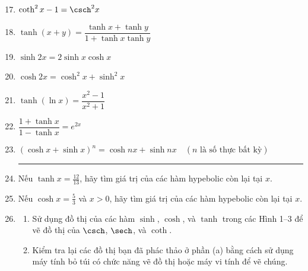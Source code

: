 \noindent
\begin{minipage}[t]{0.48\textwidth}
\raggedright

\begin{enumerate}[label=\textbf{\arabic*.}, leftmargin=1.8em, itemsep=2.5pt, topsep=0pt]
\setcounter{enumi}{16}

\item $\coth^2 x - 1 = \csch^2 x$

\item $\tanh(x + y) = \dfrac{\tanh x + \tanh y}{1 + \tanh x\tanh y}$

\item $\sinh 2x = 2\sinh x\cosh x$

\item $\cosh 2x = \cosh^2 x + \sinh^2 x$

\item $\tanh(\ln x) = \dfrac{x^2 - 1}{x^2 + 1}$

\item $\dfrac{1 + \tanh x}{1 - \tanh x} = e^{2x}$

\item $(\cosh x + \sinh x)^n = \cosh nx + \sinh nx \quad (\text{$n$ là số thực bất kỳ})$

\vspace{-1pt}
{\color{stewartcyan}\rule{\linewidth}{0.6pt}}
\vspace{-1pt}

\item Nếu $\tanh x = \frac{12}{13}$, hãy tìm giá trị của các hàm hypebolic còn lại tại $x$.

\item Nếu $\cosh x = \frac{5}{3}$ và $x > 0$, hãy tìm giá trị của các hàm hypebolic còn lại tại $x$.

\item 
\begin{enumerate}[label=\textbf{(\alph*)}, leftmargin=1.5em, itemsep=2pt, topsep=1pt]
    \item Sử dụng đồ thị của các hàm $\sinh$, $\cosh$, và $\tanh$ trong các Hình 1--3 để vẽ đồ thị của $\csch$, $\sech$, và $\coth$.
    \item \llap{\casicon\hspace{0.3em}}Kiểm tra lại các đồ thị bạn đã phác thảo ở phần (a) bằng cách sử dụng máy tính bỏ túi có chức năng vẽ đồ thị hoặc máy vi tính để vẽ chúng.
\end{enumerate}


\end{enumerate}
\end{minipage}
